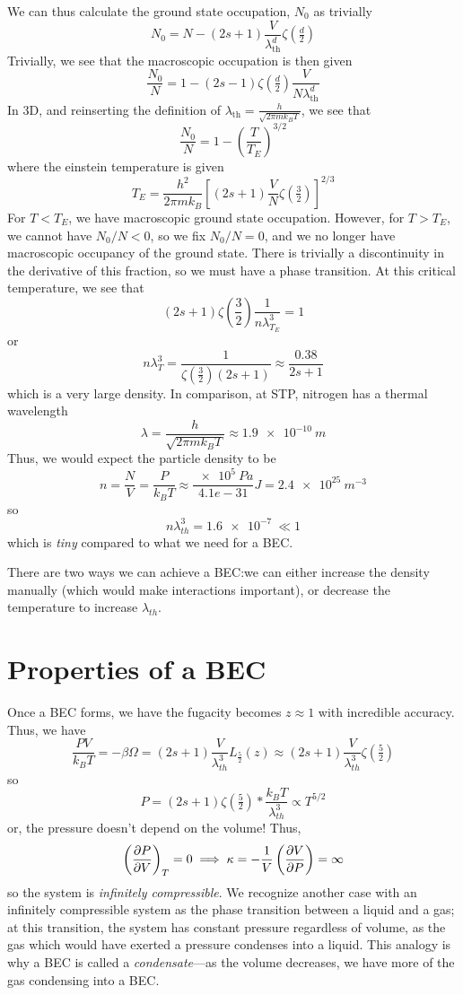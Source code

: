 We can thus calculate the ground state occupation, \(N_0\) as trivially
\begin{equation}
	N_0 = N-(2s+1)\frac{V}{\lambda^d_{\text{th}}}\zeta\left(\tfrac{d}{2}\right)
\end{equation}
Trivially, we see that the macroscopic occupation is then given
\begin{equation}
	\frac{N_0}{N}=1-(2s-1)\zeta\left(\tfrac{d}{2}\right)\frac{V}{N\lambda_{\text{th}}^d}
\end{equation}
In 3D, and reinserting the definition of \(\lambda_{\text{th}} = \frac{h}{\sqrt{2\pi mk_BT}}\), we see that
\[\frac{N_0}{N} = 1-\left(\frac{T}{T_E}\right)^{3/2}\]
where the einstein temperature is given
\begin{equation}
	T_E = \frac{h^2}{2\pi mk_B}\left[(2s+1)\frac{V}{N}\zeta\left(\tfrac{3}{2}\right)\right]^{2/3}
\end{equation}
For \(T<T_E\), we have macroscopic ground state occupation. However, for \(T>T_E\), we cannot have \(N_0/N<0\), so we fix \(N_0/N=0\), and we no longer have macroscopic occupancy of the ground state. There is trivially a discontinuity in the derivative of this fraction, so we must have a phase transition. At this critical temperature, we see that
\[(2s+1)\zeta\left(\frac{3}{2}\right)\frac{1}{n\lambda_{T_E}^3} = 1\]
or
\[n\lambda_T^3 = \frac{1}{\zeta\left(\frac{3}{2}\right)(2s+1)}\approx \frac{0.38}{2s+1}\]
which is a very large density. In comparison, at STP, nitrogen has a thermal wavelength
\[\lambda = \frac{h}{\sqrt{2\pi mk_BT}}\approx \SI{1.9e-10}{m}\]
Thus, we would expect the particle density to be
\[n = \frac{N}{V} = \frac{P}{k_BT} \approx \frac{\SI{e5}{Pa}}{4.1e-31}{J}=\SI{2.4e25}{m^{-3}}\]
so
\[n\lambda^3_{th}=\SI{1.6e-7}{}\ll1\]
which is \emph{tiny} compared to what we need for a BEC.\@

There are two ways we can achieve a BEC:\@ we can either increase the density manually (which would make interactions important), or decrease the temperature to increase \(\lambda_{th}\).

\section{Properties of a BEC}
Once a BEC forms, we have the fugacity becomes \(z\approx 1\) with incredible accuracy. Thus, we have
\[\frac{PV}{k_BT}=-\beta\Omega = (2s+1)\frac{V}{\lambda_{th}^3}L_{\frac{5}{2}}(z)\approx (2s+1)\frac{V}{\lambda^3_{th}}\zeta\left(\tfrac{5}{2}\right)\]
so
\begin{equation}
	P = (2s+1)\zeta\left(\tfrac{5}{2}\right)*\frac{k_BT}{\lambda_{th}^3}\propto T^{5/2}
\end{equation}
or, the pressure doesn't depend on the volume! Thus,
\[\left(\frac{\partial P}{\partial V}\right)_{T} = 0 \implies \kappa = -\frac{1}{V}\left(\frac{\partial V}{\partial P}\right)=\infty\]
so the system is \emph{infinitely compressible}. We recognize another case with an infinitely compressible system as the phase transition between a liquid and a gas; at this transition, the system has constant pressure regardless of volume, as the gas which would have exerted a pressure condenses into a liquid. This analogy is why a BEC is called a \emph{condensate}---as the volume decreases, we have more of the gas condensing into a BEC.\@ 

